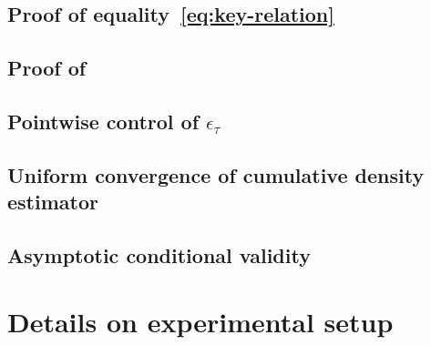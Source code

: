 \documentclass{article}
\begin{document}
\subsection{Proof of equality~\eqref{eq:key-relation}}
\label{suppl:cond-quantile}
  

\subsection{Proof of }
\label{suppl:conditional:validity}
  

\subsection{Pointwise control of $\epsilon_{\tau}$}
\label{suppl:epsilon}
  

\subsection{Uniform convergence of cumulative density estimator}
\label{suppl:cdf}
  

\subsection{Asymptotic conditional validity}
\label{suppl:asympt}
  

\newpage

\section{Details on experimental setup}
\label{suppl:details}
  
\end{document}
